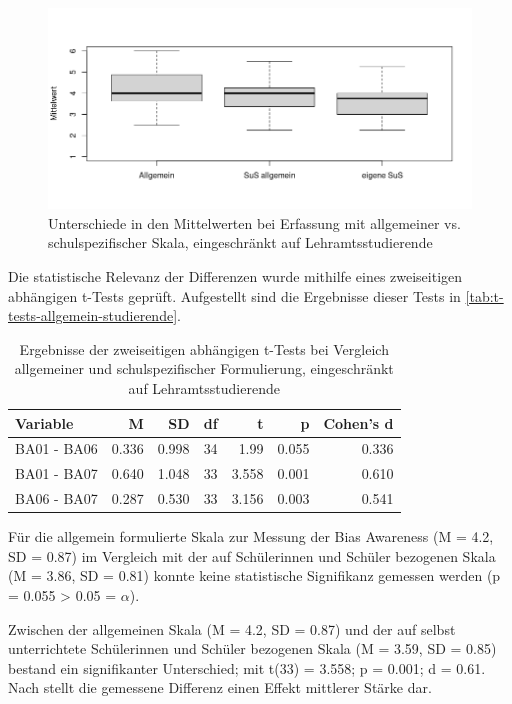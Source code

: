\begin{figure}[h!]
	\includegraphics[width=\textwidth]{resources/boxplot-allgemein-studierende.png}
	\caption{Unterschiede in den Mittelwerten bei Erfassung mit allgemeiner vs. schulspezifischer Skala, eingeschränkt auf Lehramtsstudierende}
	\label{fig:boxplot-allgemein-studierende}
\end{figure}

Die statistische Relevanz der Differenzen wurde mithilfe eines zweiseitigen abhängigen t-Tests geprüft.
Aufgestellt sind die Ergebnisse dieser Tests in \autoref{tab:t-tests-allgemein-studierende}.

\begin{table}[h!]
	\begin{tabularx}{\textwidth}{X | r | r | r | r | r | r}
		\hline
		Variable & M & SD & df & t & p & Cohen's d\\
		\hline
		BA01 - BA06 & 0.336 & 0.998 & 34 & 1.99 & 0.055 & 0.336\\
		BA01 - BA07 & 0.640 & 1.048 & 33 & 3.558 & 0.001 & 0.610\\
		BA06 - BA07 & 0.287 & 0.530 & 33 & 3.156 & 0.003 & 0.541\\
		\hline
	\end{tabularx}
	\caption{Ergebnisse der zweiseitigen abhängigen t-Tests bei Vergleich allgemeiner und schulspezifischer Formulierung, eingeschränkt auf Lehramtsstudierende}
	\label{tab:t-tests-allgemein-studierende}
\end{table}

Für die allgemein formulierte Skala zur Messung der Bias Awareness (M = 4.2, SD = 0.87) im Vergleich mit der auf Schülerinnen und Schüler bezogenen Skala (M = 3.86, SD = 0.81) konnte keine statistische Signifikanz gemessen werden (p = 0.055 > 0.05 = $\alpha$).

Zwischen der allgemeinen Skala (M = 4.2, SD = 0.87) und der auf selbst unterrichtete Schülerinnen und Schüler bezogenen Skala (M = 3.59, SD = 0.85) bestand ein signifikanter Unterschied; mit t(33) = 3.558; p = 0.001; d = 0.61.
Nach \citep{cohen1992power} stellt die gemessene Differenz einen Effekt mittlerer Stärke dar.

